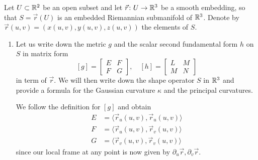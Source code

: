 \documentclass[a4paper, 12pt]{article}
\begin{document}
\begin{Exercise}
    Let $U \subset \mathbb{R}^2$ be an open subset and let $\vec{r} \colon U \to \mathbb{R}^3$ be a smooth embedding,
    so that $S = \vec{r}(U)$ is an embedded Riemannian submanifold of $\mathbb{R}^3$.
    Denote by $\vec{r}(u, v) = (x(u, v), y(u, v), z(u, v))$ the elements of $S$.
    \begin{enumerate}[label=(\roman*)]
        \item Let us write down the metric $g$ and the scalar second fundamental form $h$ on $S$ in matrix form
            \[
                [g] =
                \begin{bmatrix}
                    E & F \\
                    F & G 
                \end{bmatrix},\quad
                [h] =
                \begin{bmatrix}
                    L & M \\
                    M & N
                \end{bmatrix}
            \]
            in term of $\vec{r}$.
            We will then write down the shape operator $S$ in $\mathbb{R}^3$
            and provide a formula for the Gaussian curvature $\kappa$
            and the principal curvatures.
            
            We follow the definition for $[g]$ and obtain
            \begin{align*}
                E &= \langle \vec{r}_u(u, v), \vec{r}_u(u, v) \rangle \\
                F &= \langle \vec{r}_u(u, v), \vec{r}_v(u, v) \rangle \\
                G &= \langle \vec{r}_v(u, v), \vec{r}_v(u, v) \rangle
            \end{align*}
            since our local frame at any point is now given by $\partial_u\vec{r}, \partial_v\vec{r}$.


\end{enumerate}
\end{Exercise}
\end{document}

